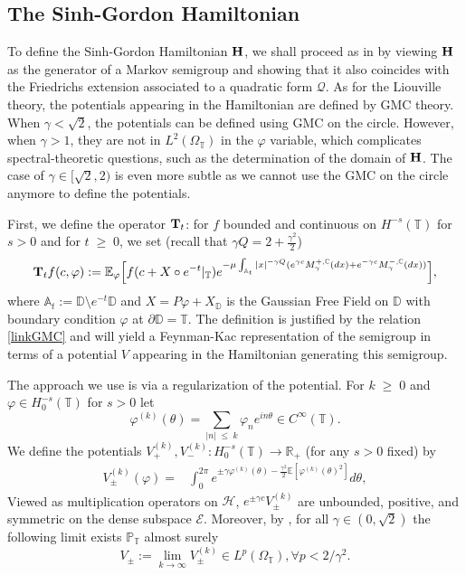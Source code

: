 \documentclass[11pt]{amsart}
\numberwithin{equation}{section}
\theoremstyle{definition}
\renewcommand{\leq}{\;\leqslant\;}                   %
\renewcommand{\geq}{\;\geqslant\;}                   %
\newcommand{\C}{\mathbb{C}}
\newcommand{\A}{\mathbb{A}}
\newcommand{\D}{\mathbb{D}}
\newcommand{\R}{\mathbb{R}}
\def\P{\mathbb{P}}
\def\E{\mathbb{E}}
\newcommand{\pl}{\partial}
\newcommand{\mc}{\mathcal}
\def\T{\mathbb{T}}
\begin{document}
\subsection{The Sinh-Gordon Hamiltonian} \label{sec:Sinh_hamiltonian}

To define the Sinh-Gordon Hamiltonian ${\bf H}$, we shall proceed as in \cite[Section 5]{GKRV} by viewing ${\bf H}$ as the generator of a Markov semigroup and showing that it also coincides with the Friedrichs extension associated to a quadratic form $\mc{Q}$. As for the Liouville theory, the potentials appearing in the Hamiltonian are defined by GMC theory. When $\gamma < \sqrt 2$, the potentials can be defined using GMC on the circle. However, when $\gamma>1$, they are not in $L^2(\Omega_\T)$ in the $\varphi$ variable, which complicates spectral-theoretic questions, such as the determination of the domain of ${\bf H}$. The case of $\gamma \in [\sqrt{2},2)$ is even more subtle as we cannot use the GMC on the circle anymore to define the potentials.

First, we define the operator ${\bf T}_t$: for $f$ bounded and continuous on $H^{-s}(\T)$ for $s>0$ and for $t\geq 0$, we set (recall that $\gamma Q=2+\frac{\gamma^2}{2}$)
\begin{equation}\label{propagatorT_t}
\begin{split}
{\bf T}_tf(c,\varphi):= \E_{\varphi}\Big[f(c+X\circ e^{-t}|_\T)e^{-\mu\int_{\A_t}|x|^{-\gamma Q}(e^{\gamma c}M_\gamma^{+,\C}(dx)+e^{-\gamma c}M^{-,\C}_\gamma(dx))} \Big],
\end{split}
\end{equation} 
where $\A_t:=\D\setminus e^{-t}\D$  and $X=P\varphi+X_\D$ is the Gaussian Free Field on $\D$ with boundary condition $\varphi$ at $\pl \D=\T$.
The definition is justified by the relation  \eqref{linkGMC} and will yield a Feynman-Kac representation of the semigroup in terms of a potential $V$ appearing in the Hamiltonian generating this semigroup.

The approach we use is via a regularization of the potential. 
For $k \geq 0$ and $\varphi \in H_0^{-s}(\T)$ for $s>0$ let
\begin{equation}
\varphi^{(k)}(\theta)
=
\sum_{|n| \leq k} \varphi_n e^{i n \theta}\in C^\infty(\T).
\end{equation}
We  define the potentials $V^{(k)}_+, V^{(k)}_-: H^{-s}_0(\T) \rightarrow \R_+$ (for any $s>0$ fixed)
by 
\begin{equation}
\begin{split}
V_{\pm}^{(k)}(\varphi)=& 
\int_0^{2\pi} e^{\pm \gamma \varphi^{(k)}(\theta) - \frac{\gamma^2}2 \E[\varphi^{(k)}(\theta)^2]} d\theta,  
\end{split}
\end{equation}
Viewed as multiplication operators on $\mc{H}$, $e^{\pm \gamma c}V^{(k)}_\pm$ are unbounded, positive, 
and symmetric on the dense subspace $\mc{E}$. Moreover, by \cite{Kahane85,rhodes2014_gmcReview}, for all $\gamma\in (0,\sqrt{2})$ 
the following limit exists $\P_\T$ almost surely 
\begin{equation}\label{Upm} 
V_\pm:=\lim_{k\to \infty}V_{\pm}^{(k)} \in L^{p}(\Omega_\T), \forall p<2/\gamma^2.
\end{equation}
\end{document}
